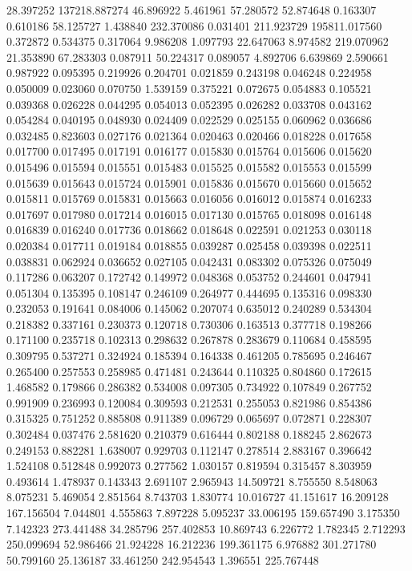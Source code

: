 28.397252
137218.887274
46.896922
5.461961
57.280572
52.874648
0.163307
0.610186
58.125727
1.438840
232.370086
0.031401
211.923729
195811.017560
0.372872
0.534375
0.317064
9.986208
1.097793
22.647063
8.974582
219.070962
21.353890
67.283303
0.087911
50.224317
0.089057
4.892706
6.639869
2.590661
0.987922
0.095395
0.219926
0.204701
0.021859
0.243198
0.046248
0.224958
0.050009
0.023060
0.070750
1.539159
0.375221
0.072675
0.054883
0.105521
0.039368
0.026228
0.044295
0.054013
0.052395
0.026282
0.033708
0.043162
0.054284
0.040195
0.048930
0.024409
0.022529
0.025155
0.060962
0.036686
0.032485
0.823603
0.027176
0.021364
0.020463
0.020466
0.018228
0.017658
0.017700
0.017495
0.017191
0.016177
0.015830
0.015764
0.015606
0.015620
0.015496
0.015594
0.015551
0.015483
0.015525
0.015582
0.015553
0.015599
0.015639
0.015643
0.015724
0.015901
0.015836
0.015670
0.015660
0.015652
0.015811
0.015769
0.015831
0.015663
0.016056
0.016012
0.015874
0.016233
0.017697
0.017980
0.017214
0.016015
0.017130
0.015765
0.018098
0.016148
0.016839
0.016240
0.017736
0.018662
0.018648
0.022591
0.021253
0.030118
0.020384
0.017711
0.019184
0.018855
0.039287
0.025458
0.039398
0.022511
0.038831
0.062924
0.036652
0.027105
0.042431
0.083302
0.075326
0.075049
0.117286
0.063207
0.172742
0.149972
0.048368
0.053752
0.244601
0.047941
0.051304
0.135395
0.108147
0.246109
0.264977
0.444695
0.135316
0.098330
0.232053
0.191641
0.084006
0.145062
0.207074
0.635012
0.240289
0.534304
0.218382
0.337161
0.230373
0.120718
0.730306
0.163513
0.377718
0.198266
0.171100
0.235718
0.102313
0.298632
0.267878
0.283679
0.110684
0.458595
0.309795
0.537271
0.324924
0.185394
0.164338
0.461205
0.785695
0.246467
0.265400
0.257553
0.258985
0.471481
0.243644
0.110325
0.804860
0.172615
1.468582
0.179866
0.286382
0.534008
0.097305
0.734922
0.107849
0.267752
0.991909
0.236993
0.120084
0.309593
0.212531
0.255053
0.821986
0.854386
0.315325
0.751252
0.885808
0.911389
0.096729
0.065697
0.072871
0.228307
0.302484
0.037476
2.581620
0.210379
0.616444
0.802188
0.188245
2.862673
0.249153
0.882281
1.638007
0.929703
0.112147
0.278514
2.883167
0.396642
1.524108
0.512848
0.992073
0.277562
1.030157
0.819594
0.315457
8.303959
0.493614
1.478937
0.143343
2.691107
2.965943
14.509721
8.755550
8.548063
8.075231
5.469054
2.851564
8.743703
1.830774
10.016727
41.151617
16.209128
167.156504
7.044801
4.555863
7.897228
5.095237
33.006195
159.657490
3.175350
7.142323
273.441488
34.285796
257.402853
10.869743
6.226772
1.782345
2.712293
250.099694
52.986466
21.924228
16.212236
199.361175
6.976882
301.271780
50.799160
25.136187
33.461250
242.954543
1.396551
225.767448
